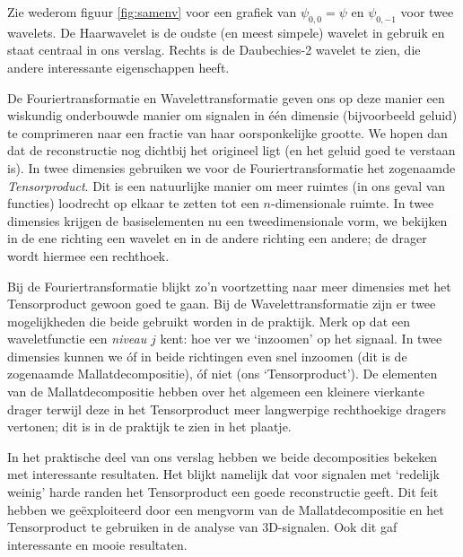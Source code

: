 Zie wederom figuur \ref{fig:samenv} voor een grafiek van $\psi_{0,0} = \psi$ en $\psi_{0,-1}$ voor twee wavelets. De Haarwavelet is de oudste (en meest simpele) wavelet in gebruik en staat centraal in ons verslag. 
Rechts is de Daubechies-2 wavelet te zien, die andere interessante eigenschappen heeft.

De Fouriertransformatie en Wavelettransformatie geven ons op deze manier een wiskundig onderbouwde manier om signalen in \'e\'en dimensie (bijvoorbeeld geluid) te comprimeren naar een fractie van haar oorsponkelijke grootte. We hopen dan dat de reconstructie nog dichtbij het origineel ligt (en het geluid goed te verstaan is). In twee dimensies gebruiken we voor de Fouriertransformatie het zogenaamde \emph{Tensorproduct}. Dit is een natuurlijke manier om meer ruimtes (in ons geval van functies) loodrecht op elkaar te zetten tot een $n$-dimensionale ruimte. In twee dimensies krijgen de basiselementen nu een tweedimensionale vorm, we bekijken in de ene richting een wavelet en in de andere richting een andere; de drager wordt hiermee een rechthoek.

Bij de Fouriertransformatie blijkt zo'n voortzetting naar meer dimensies met het Tensorproduct gewoon goed te gaan. Bij de Wavelettransformatie zijn er twee mogelijkheden die beide gebruikt worden in de praktijk. Merk op dat een waveletfunctie een \emph{niveau} $j$ kent: hoe ver we `inzoomen' op het signaal. In twee dimensies kunnen we \'of in beide richtingen even snel inzoomen (dit is de zogenaamde Mallatdecompositie), \'of niet (ons `Tensorproduct').
De elementen van de Mallatdecompositie hebben over het algemeen een kleinere vierkante drager terwijl deze in het Tensorproduct meer
 langwerpige rechthoekige dragers vertonen; dit is in de praktijk te zien in het plaatje.

In het praktische deel van ons verslag hebben we beide decomposities bekeken met interessante resultaten. Het blijkt namelijk dat voor signalen met `redelijk weinig' harde randen het Tensorproduct een goede reconstructie geeft. Dit feit hebben we ge\"exploiteerd door een mengvorm van de Mallatdecompositie en het Tensorproduct te gebruiken in de analyse van 3D-signalen. Ook dit gaf interessante en mooie resultaten.

